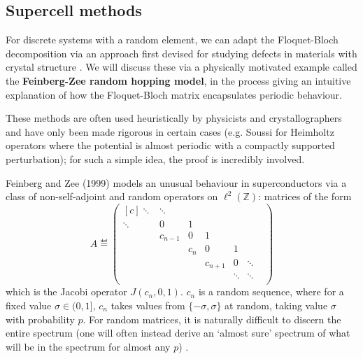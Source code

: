 \documentclass[../main.tex]{subfiles}
\begin{document}
\subsection{Supercell methods} For discrete systems with
a random element, we can adapt the Floquet-Bloch decomposition
via an approach first devised for studying defects in materials with crystal structure
\cite{nieminen2007supercell}. We will discuss these via a physically motivated
example called the \textbf{Feinberg-Zee random hopping model},
 in the process giving an intuitive explanation
of how the Floquet-Bloch matrix encapsulates periodic behaviour.

These methods are often used heuristically by physicists and crystallographers
and have only been made rigorous in certain cases (e.g. Soussi
\cite{soussi2006convergence} for Heimholtz operators where the potential is
almost periodic with a compactly supported perturbation); for such a simple
idea, the proof is incredibly involved. 

Feinberg and Zee (1999) \cite{feinberg1999nonhermitian} models an unusual
behaviour in superconductors via a class of non-self-adjoint and random
operators on $\ell^2(\mathbb{Z})$: matrices of the form
  $$ 
  A \eqdef
  \begin{pmatrix*}[c]
    \ddots & \ddots & & & & \\
    \ddots & 0 & 1 & & & \\
    & c_{n-1} & 0 & 1 & & \\
    & & c_{n} & 0 & 1 & \\
    & & & c_{n+1} & 0 & \ddots \\
    & & & & \ddots & \ddots & \\ \end{pmatrix*}
  $$
which is the Jacobi operator $J(c_n, 0, 1)$. $c_n$ is a random sequence, where
for a fixed value $\sigma \in (0, 1]$, $c_n$ takes values from $\{-\sigma,
\sigma\}$ at random, taking value $\sigma$ with probability $p$. For random
matrices, it is naturally difficult to discern the entire spectrum (one will
often instead derive an `almost sure' spectrum of what will be in the spectrum
for almost any $p$) \cite{chandler-wilde2012spectrum}.\\
\end{document}
